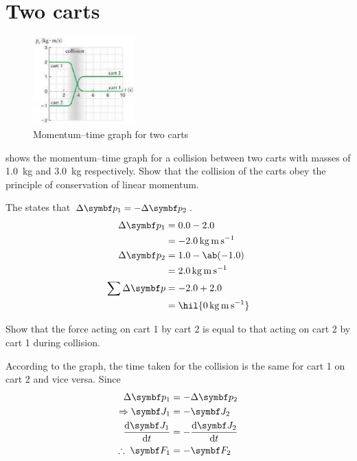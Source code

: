 \section{Two carts}
\begin{figure}
  \centering
  \includegraphics[width=0.35\textwidth]{assets/momentumgraph.png}
  \caption{Momentum--time graph for two carts}
  \label{fig:twocarts}
\end{figure}
\begin{problem}
   shows the momentum--time graph for a
  collision between
  two carts with masses of \qty{1.0}{\kg} and \qty{3.0}{\kg} respectively.
  Show that the collision of the carts obey the principle of conservation
  of linear momentum.
\end{problem}

The  states that
\(\Delta\mv{p}_1 = -\Delta\mv{p}_2\).
\begin{align*}
  \Delta\mv{p}_1 &= 0.0 - 2.0 \\
  &= \qty{-2.0}{\kg\m\per\second} \\
  \Delta\mv{p}_2 &= 1.0 - \ab(-1.0) \\
  &= \qty{2.0}{\kg\m\per\second} \\
  \sum\Delta\mv{p} &= -2.0 + 2.0 \\
  &= \hil{\qty{0}{\kg\m\per\second}}
\end{align*}

\begin{problem}
  Show that the force acting on cart 1 by cart 2 is equal to that
  acting on cart 2 by cart 1 during collision.
\end{problem}
According to the graph, the time taken for the collision is the same
for cart 1 on cart 2 and vice versa. Since
\begin{align*}
  \Delta\mv{p}_1 &= -\Delta\mv{p}_2 \\
  \Rightarrow \mv{J}_1 &= -\mv{J}_2 \\
  \odv{\mv{J}_1}{t} &= -\odv{\mv{J}_2}{t} \\
  \therefore\; \mv{F}_1 &= -\mv{F}_2
\end{align*}

